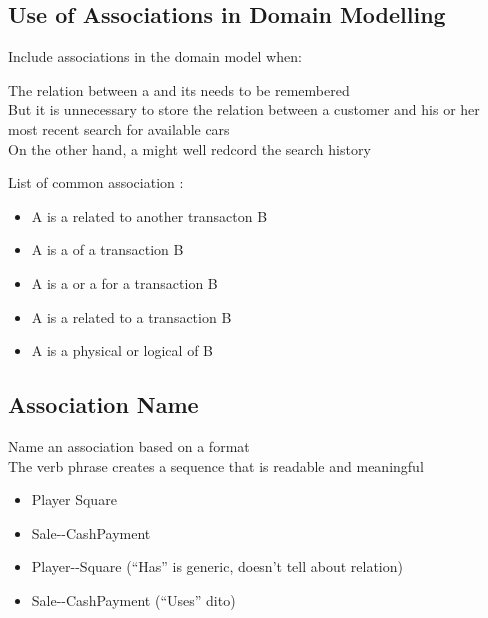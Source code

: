 \subsection{Use of Associations in Domain Modelling}
\begin{defBox}[title=Heuristics]
    Include associations in the domain model when: 
\end{defBox}
\begin{defBox}[title=Example]
    The relation between a  and its  needs to be remembered\\
    But it is unnecessary to store the relation between a customer and his or her most recent search for available cars\\
    On the other hand, a  might well redcord the search history
\end{defBox}
List of common association :
\begin{itemize}
    \item A is a  related to another transacton B
    \item A is a  of a transaction B
    \item A is a  or a  for a transaction B
    \item A is a  related to a transaction B
    \item A is a physical or logical  of B
\end{itemize}

\subsection{Association Name}
\begin{defBox}
    Name an association based on a  format\\
    The verb phrase creates a sequence that is readable and meaningful
\end{defBox}
\begin{itemize}
    \item Player  Square
    \item Sale--CashPayment
\end{itemize}
\begin{itemize}
    \item Player--Square (\enquote{Has} is generic, doesn't tell about relation)
    \item Sale--CashPayment (\enquote{Uses} dito)
\end{itemize}

